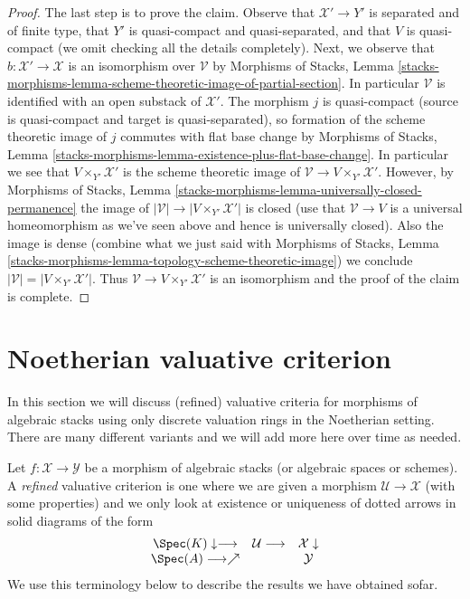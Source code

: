 \begin{proof}
\medskip\noindent
The last step is to prove the claim.
Observe that $\mathcal{X}' \to Y'$ is separated and of finite type,
that $Y'$ is quasi-compact and quasi-separated, and that $V$ is quasi-compact
(we omit checking all the details completely).
Next, we observe that
$b : \mathcal{X}' \to \mathcal{X}$ is an isomorphism over
$\mathcal{V}$ by Morphisms of Stacks, Lemma
\ref{stacks-morphisms-lemma-scheme-theoretic-image-of-partial-section}.
In particular $\mathcal{V}$ is identified with an open substack
of $\mathcal{X}'$.
The morphism $j$ is quasi-compact
(source is quasi-compact and target is quasi-separated), so formation
of the scheme theoretic image of $j$ commutes with flat base change by
Morphisms of Stacks, Lemma
\ref{stacks-morphisms-lemma-existence-plus-flat-base-change}.
In particular we see that $V \times_{Y'} \mathcal{X}'$ is the
scheme theoretic image of
$\mathcal{V} \to V \times_{Y'} \mathcal{X}'$.
However, by Morphisms of Stacks, Lemma
\ref{stacks-morphisms-lemma-universally-closed-permanence}
the image of $|\mathcal{V}| \to |V \times_{Y'} \mathcal{X}'|$
is closed (use that $\mathcal{V} \to V$ is a universal homeomorphism
as we've seen above and hence is universally closed).
Also the image is dense (combine what we just said with
Morphisms of Stacks, Lemma
\ref{stacks-morphisms-lemma-topology-scheme-theoretic-image})
we conclude $|\mathcal{V}| = |V \times_{Y'} \mathcal{X}'|$.
Thus $\mathcal{V} \to V \times_{Y'} \mathcal{X}'$ is an
isomorphism and the proof of the claim is complete.
\end{proof}

\section{Noetherian valuative criterion}
\label{stacks-more-morphisms-section-Noetherian-valuative-criterion}
In this section we will discuss (refined) valuative criteria for
morphisms of algebraic stacks using only discrete valuation rings
in the Noetherian setting. There are many different variants
and we will add more here over time as needed.

\medskip\noindent
Let $f : \mathcal{X} \to \mathcal{Y}$ be a morphism of algebraic stacks
(or algebraic spaces or schemes). A {\it refined} valuative criterion
is one where we are given a morphism $\mathcal{U} \to \mathcal{X}$
(with some properties) and we only look at existence or uniqueness
of dotted arrows in solid diagrams of the form
$$
\begin{array}{ccc}\Spec(K) \downarrow\longrightarrow & \mathcal{U} \longrightarrow & \mathcal{X} \downarrow \\ \Spec(A) \longrightarrow\nearrow &  & \mathcal{Y}\end{array}
$$
We use this terminology below to describe the results we have obtained sofar.

